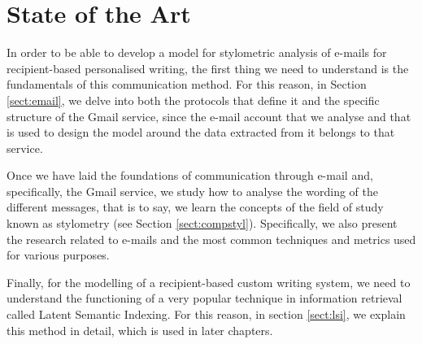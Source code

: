 \chapter{State of the Art}
\label{cap:estadoDeLaCuestion}

In order to be able to develop a model for stylometric analysis of e-mails for recipient-based personalised writing, the first thing we need to understand is the fundamentals of this communication method. For this reason, in Section \ref{sect:email}, we delve into both the protocols that define it and the specific structure of the Gmail service, since the e-mail account that we analyse and that is used to design the model around the data extracted from it belongs to that service.

Once we have laid the foundations of communication through e-mail and, specifically, the Gmail service, we study how to analyse the wording of the different messages, that is to say, we learn the concepts of the field of study known as stylometry (see Section \ref{sect:compstyl}). Specifically, we also present the research related to e-mails and the most common techniques and metrics used for various purposes.

Finally, for the modelling of a recipient-based custom writing system, we need to understand the functioning of a very popular technique in information retrieval called Latent Semantic Indexing. For this reason, in section \ref{sect:lsi}, we explain this method in detail, which is used in later chapters.





